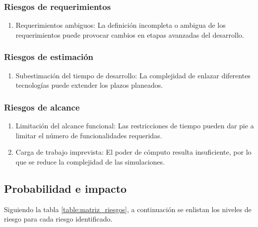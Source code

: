 \subsubsection{Riesgos de requerimientos}
\begin{enumerate}[label*=RR\arabic*]
	\item Requerimientos ambiguos: La definición incompleta o ambigua de los requerimientos puede provocar cambios en etapas avanzadas del desarrollo.
\end{enumerate}

\subsubsection{Riesgos de estimación}
\begin{enumerate}[label*=RE\arabic*]
	\item Subestimación del tiempo de desarrollo: La complejidad de enlazar diferentes tecnologías puede extender los plazos planeados.
\end{enumerate}

\subsubsection{Riesgos de alcance}
\begin{enumerate}[label*=RA\arabic*]
	\item Limitación del alcance funcional: Las restricciones de tiempo pueden dar pie a limitar el número de funcionalidades requeridas.

	\item Carga de trabajo imprevista: El poder de cómputo resulta insuficiente, por lo que se reduce la complejidad de las simulaciones.
\end{enumerate}

\subsection{Probabilidad e impacto}

Siguiendo la tabla \ref{table:matriz_riesgos}, a continuación se enlistan los niveles de riesgo para cada riesgo identificado.


